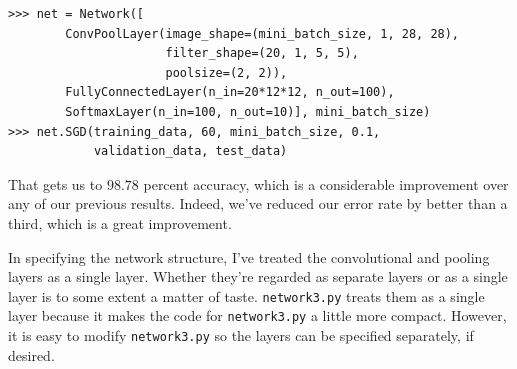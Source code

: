 \begin{lstlisting}
>>> net = Network([
        ConvPoolLayer(image_shape=(mini_batch_size, 1, 28, 28), 
                      filter_shape=(20, 1, 5, 5), 
                      poolsize=(2, 2)),
        FullyConnectedLayer(n_in=20*12*12, n_out=100),
        SoftmaxLayer(n_in=100, n_out=10)], mini_batch_size)
>>> net.SGD(training_data, 60, mini_batch_size, 0.1, 
            validation_data, test_data)   

\end{lstlisting}


That gets us to $98.78$ percent accuracy, which is a considerable improvement over any of our previous results. Indeed, we've reduced our error rate by better than a third, which is a great improvement.


In specifying the network structure, I've treated the convolutional and pooling layers as a single layer. Whether they're regarded as separate layers or as a single layer is to some extent a matter of taste. \texttt{network3.py} treats them as a single layer because it makes the code for \texttt{network3.py} a little more compact. However, it is easy to modify \texttt{network3.py} so the layers can be specified separately, if desired.



